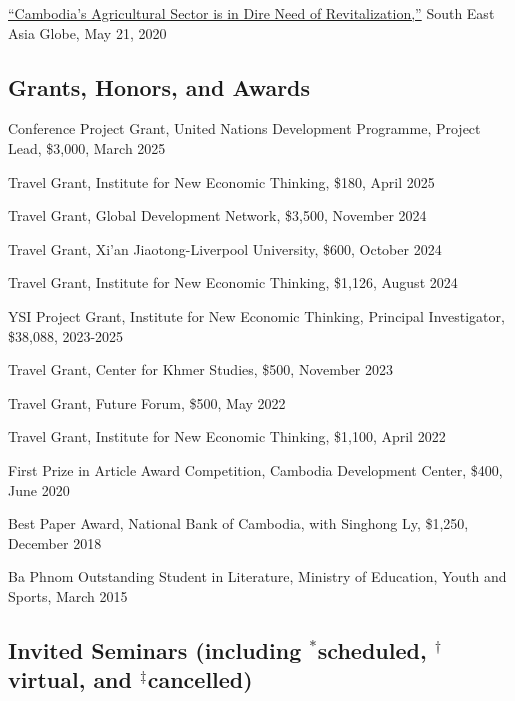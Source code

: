 \documentclass[10pt,a4paper]{article}
\begin{document}
	 \href{https://southeastasiaglobe.com/cambodias-agricultural-sector-is-one-in-dire-need-of-revitalising}{``Cambodia’s Agricultural Sector is in Dire Need of Revitalization,''} South East Asia Globe, May 21, 2020

\subsection*{Grants, Honors, and Awards}

\parindent=0pt

Conference Project Grant, United Nations Development Programme, Project Lead, \$3,000, March 2025

Travel Grant, Institute for New Economic Thinking, \$180, April 2025

Travel Grant, Global Development Network, \$3,500, November 2024

Travel Grant, Xi'an Jiaotong-Liverpool University, \$600, October 2024

Travel Grant, Institute for New Economic Thinking, \$1,126, August 2024

YSI Project Grant, Institute for New Economic Thinking, Principal Investigator, \$38,088, 2023-2025

Travel Grant, Center for Khmer Studies, \$500, November 2023

Travel Grant, Future Forum, \$500, May 2022

Travel Grant, Institute for New Economic Thinking, \$1,100, April 2022

First Prize in Article Award Competition, Cambodia Development Center, \$400, June 2020

Best Paper Award, National Bank of Cambodia, with Singhong Ly, \$1,250, December 2018 

Ba Phnom Outstanding Student in Literature, Ministry of Education, Youth and Sports, March 2015


\subsection*{Invited Seminars (including $^\ast$scheduled, $^\dag$virtual, and $^\ddag$cancelled)}
\end{document}
